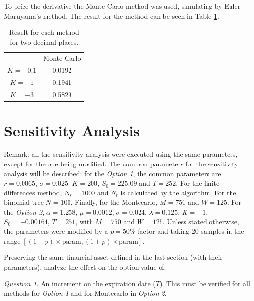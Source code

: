 \documentclass[11pt]{article}
\theoremstyle{definition}
\theoremstyle{remark}
\theoremstyle{remark}
\newtheorem{question}{Question}
\begin{document}
To price the derivative the Monte Carlo method was used, simulating by
Euler-Maruyama's method. The result for the method can be seen in Table
\ref{tab:comp2}.

\begin{table}[H]
\centering
\begin{tabular}{cc}
\hline
         & Monte Carlo \\
$K=-0.1$ & 0.0192      \\
$K=-1$   & 0.1941      \\
$K=-3$   & 0.5829      \\ \hline
\end{tabular}
\caption{Result for each method for two decimal places.}
\label{tab:comp2}
\end{table}
\section*{Sensitivity Analysis}
Remark: all the sensitivity analysis were executed using the same parameters,
except for the one being modified. The common parameters for the sensitivity
analysis will be described: for the \textit{Option 1}, the common parameters are
$r=0.0065$, $\sigma=0.025$, $K=200$, $S_0=225.09$ and $T=252$. For the finite
differences method, $N_s=1000$ and $N_t$ is calculated by the algorithm. For the
binomial tree $N=100$. Finally, for the Montecarlo, $M=750$ and $W=125$. For the
\textit{Option 2}, $\alpha=1.258$, $\mu=0.0012$, $\sigma=0.024$,
$\lambda=0.125$, $K=-1$, $S_0=-0.00164$, $T=251$, with $M=750$ and $W=125$.
Unless stated otherwise, the parameters were modified by a $p=50\%$ factor and
taking 20 samples in the range
$[(1-p)\times\textrm{param}, (1+p)\times\textrm{param}]$.


Preserving the same financial asset defined in the last section (with their
parameters), analyze the effect on the option value of:

\begin{question}
  An increment on the expiration date ($T$). This must be verified for all
  methods for \textit{Option 1} and for Montecarlo in \textit{Option 2}.
\end{question}
\end{document}
